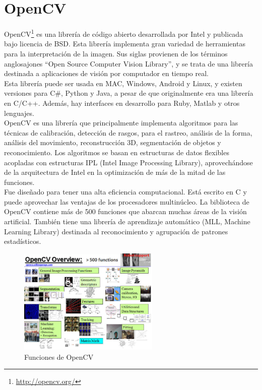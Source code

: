 \section{OpenCV}
OpenCV\footnote{\url{http://opencv.org/}} es una librería de código abierto desarrollada por Intel y publicada bajo licencia de BSD. Esta librería implementa gran variedad de herramientas para la interpretación de la imagen. Sus siglas provienen de los términos anglosajones ``Open Source Computer Vision Library'', y se trata de una librería destinada a aplicaciones de visión por computador en tiempo real.  \\

Esta librería puede ser usada en MAC, Windows, Android y Linux, y existen versiones para C\#, Python y Java, a pesar de que originalmente era una librería en C/C++. Además, hay interfaces en desarrollo para Ruby, Matlab y otros lenguajes.\\

OpenCV es una librería que principalmente implementa algoritmos para las técnicas de calibración, detección de rasgos, para el rastreo, análisis de la forma, análisis del movimiento, reconstrucción 3D, segmentación de objetos y reconocimiento. Los algoritmos se basan en estructuras de datos flexibles acopladas con estructuras IPL (Intel Image Processing Library), aprovechándose de la arquitectura de Intel en la optimización de más de la mitad de las funciones.  \\

Fue diseñado para tener una alta eficiencia computacional. Está escrito en C y puede aprovechar las ventajas de los procesadores multinúcleo. La biblioteca de OpenCV contiene más de 500 funciones que abarcan muchas áreas de la visión artificial. También tiene una librería de aprendizaje automático (MLL, Machine Learning Library) destinada al reconocimiento y agrupación de patrones estadísticos. 

\begin{figure}[H]
  \begin{center}
    \includegraphics[width=0.6\textwidth]{figures/Infraestructura/opencv.png}
		\caption{Funciones de OpenCV }
		\label{fig.opencv}
		\end{center}
\end{figure}

